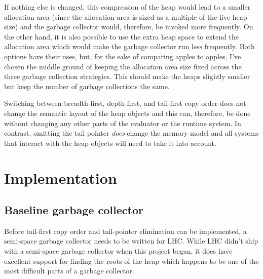 \documentclass[a4paper,oneside]{memoir}
\begin{document}
If nothing else is changed, this compression of the heap would lead to a smaller
allocation area (since the allocation area is sized as a multiple of the live heap
size)
and the garbage collector would, therefore, be invoked more frequently. On the other
hand, it is also possible to use the extra heap space to extend the allocation area
which would make the garbage collector run less frequently. Both options have
their uses, but, for the sake of comparing apples to apples, I've chosen the
middle ground of keeping the allocation area size fixed across the three garbage
collection strategies. This should make the heaps slightly smaller but keep the
number of garbage collections the same.

Switching between breadth-first, depth-first, and tail-first copy order does not
change the semantic layout of the heap objects and this can, therefore, be done
without changing any other parts of the evaluator or the runtime system. In
contrast, omitting the tail pointer \emph{does} change the memory model and
all systems that interact with the heap objects will need to take it into
account.



\section{Implementation}

\subsection{Baseline garbage collector}\label{algorithm}

Before tail-first copy order and tail-pointer elimination can be implemented,
a semi-space garbage collector needs to be written for LHC. While LHC didn't
ship with a semi-space garbage collector when this project began, it does have
excellent support for finding the roots of the heap which happens to be one of
the most difficult parts of a garbage collector.
\end{document}
